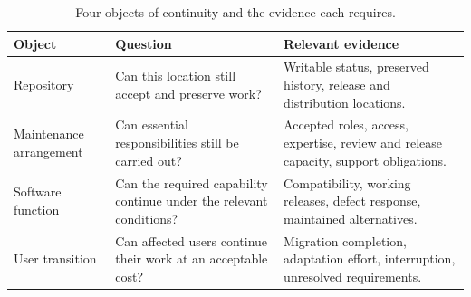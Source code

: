 \begin{table}[tbp]
\caption{Four objects of continuity and the evidence each requires.}
\label{tab:ch8-objects}
\centering\small\renewcommand{\arraystretch}{1.14}
\begin{tabularx}{\linewidth}{@{}>{\raggedright\arraybackslash}p{25mm}>{\raggedright\arraybackslash}X>{\raggedright\arraybackslash}X@{}}\toprule
Object & Question & Relevant evidence \\\midrule
Repository & Can this location still accept and preserve work? & Writable status, preserved history, release and distribution locations.\\
Maintenance arrangement & Can essential responsibilities still be carried out? & Accepted roles, access, expertise, review and release capacity, support obligations.\\
Software function & Can the required capability continue under the relevant conditions? & Compatibility, working releases, defect response, maintained alternatives.\\
User transition & Can affected users continue their work at an acceptable cost? & Migration completion, adaptation effort, interruption, unresolved requirements.\\\bottomrule
\end{tabularx}
\end{table}
